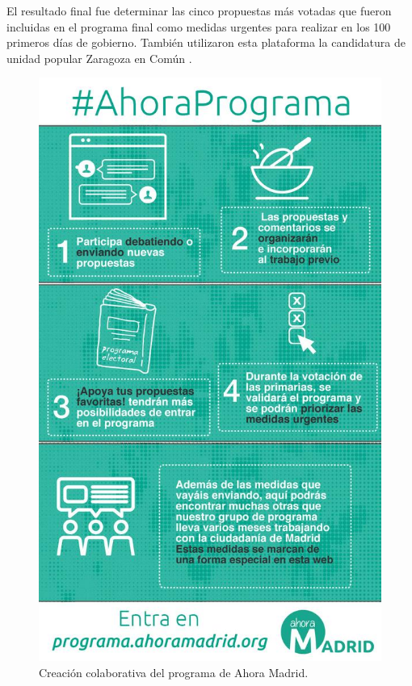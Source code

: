 El resultado final fue determinar las cinco propuestas más votadas que fueron incluidas en el programa final como medidas urgentes para realizar en los 100 primeros días de gobierno. También utilizaron esta plataforma la candidatura de unidad popular Zaragoza en Común \cite{ref:zaragonzaEnComun}.

\begin{figure}[H]
\centering
\includegraphics[keepaspectratio, scale=0.35]{Media/Captures/programaAhoraMadrid.jpg}
\caption{Creación colaborativa del programa de Ahora Madrid.}
\label{fig:programaAhoraMadrid}
\end{figure}